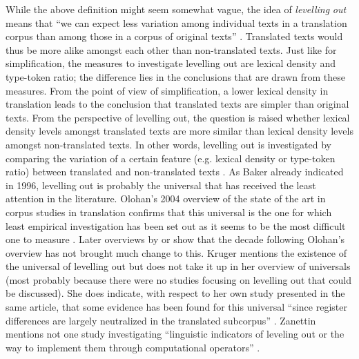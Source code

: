 While the above definition might seem somewhat vague, the idea of \textit{levelling} \textit{out} means that “we can expect less variation among individual texts in a translation corpus than among those in a corpus of original texts” \citep[177]{baker_corpus-based_1996}. Translated texts would thus be more alike amongst each other than non-translated texts. Just like for simplification, the measures to investigate levelling out are lexical density and type-token ratio; the difference lies in the conclusions that are drawn from these measures. From the point of view of simplification, a lower lexical density in translation leads to the conclusion that translated texts are simpler than original texts. From the perspective of levelling out, the question is raised whether lexical density levels amongst translated texts are more similar than lexical density levels amongst non-translated texts. In other words, levelling out is investigated by comparing the variation of a certain feature (e.g. lexical density or type-token ratio) between translated and non-translated texts \citep[184]{baker_corpus-based_1996}. As Baker already indicated in 1996, levelling out is probably the universal that has received the least attention in the literature. Olohan’s 2004 overview of the state of the art in corpus studies in translation confirms that this universal is the one for which least empirical investigation has been set out as it seems to be the most difficult one to measure \citep[100]{Olohan2004}. Later overviews by \citet{Kruger2012} or \citet{zanettin_corpus_2013} show that the decade following Olohan’s overview has not brought much change to this. Kruger mentions the existence of the universal of levelling out but does not take it up in her overview of universals (most probably because there were no studies focusing on levelling out that could be discussed). She does indicate, with respect to her own study presented in the same article, that some evidence has been found for this universal “since register differences are largely neutralized in the translated subcorpus” \citep[369]{Kruger2012}. Zanettin mentions not one study investigating “linguistic indicators of leveling out or the way to implement them through computational operators” \citep[23]{zanettin_corpus_2013}.\largerpage

